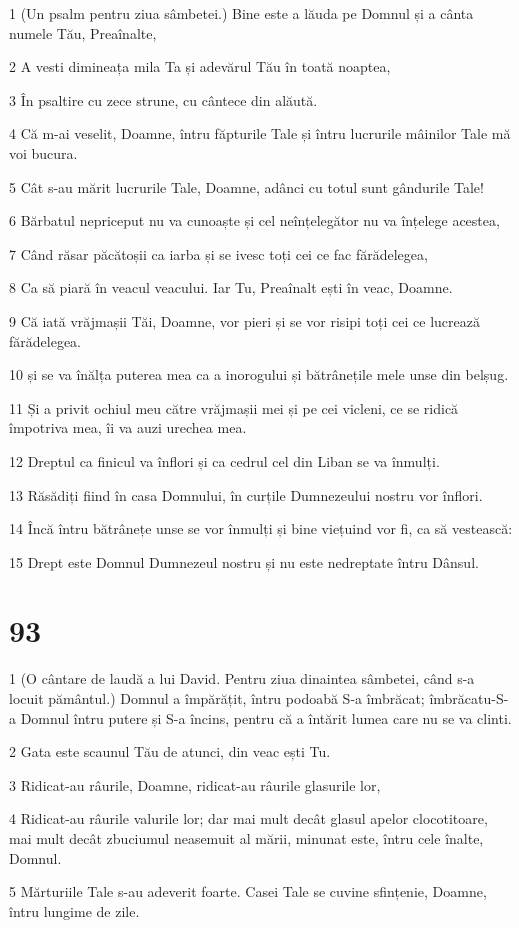 \par 1 (Un psalm pentru ziua sâmbetei.) Bine este a lăuda pe Domnul și a cânta numele Tău, Preaînalte,
\par 2 A vesti dimineața mila Ta și adevărul Tău în toată noaptea,
\par 3 În psaltire cu zece strune, cu cântece din alăută.
\par 4 Că m-ai veselit, Doamne, întru făpturile Tale și întru lucrurile mâinilor Tale mă voi bucura.
\par 5 Cât s-au mărit lucrurile Tale, Doamne, adânci cu totul sunt gândurile Tale!
\par 6 Bărbatul nepriceput nu va cunoaște și cel neînțelegător nu va înțelege acestea,
\par 7 Când răsar păcătoșii ca iarba și se ivesc toți cei ce fac fărădelegea,
\par 8 Ca să piară în veacul veacului. Iar Tu, Preaînalt ești în veac, Doamne.
\par 9 Că iată vrăjmașii Tăi, Doamne, vor pieri și se vor risipi toți cei ce lucrează fărădelegea.
\par 10 și se va înălța puterea mea ca a inorogului și bătrânețile mele unse din belșug.
\par 11 Și a privit ochiul meu către vrăjmașii mei și pe cei vicleni, ce se ridică împotriva mea, îi va auzi urechea mea.
\par 12 Dreptul ca finicul va înflori și ca cedrul cel din Liban se va înmulți.
\par 13 Răsădiți fiind în casa Domnului, în curțile Dumnezeului nostru vor înflori.
\par 14 Încă întru bătrânețe unse se vor înmulți și bine viețuind vor fi, ca să vestească:
\par 15 Drept este Domnul Dumnezeul nostru și nu este nedreptate întru Dânsul.

\chapter{93}

\par 1 (O cântare de laudă a lui David. Pentru ziua dinaintea sâmbetei, când s-a locuit pământul.) Domnul a împărățit, întru podoabă S-a îmbrăcat; îmbrăcatu-S-a Domnul întru putere și S-a încins, pentru că a întărit lumea care nu se va clinti.
\par 2 Gata este scaunul Tău de atunci, din veac ești Tu.
\par 3 Ridicat-au râurile, Doamne, ridicat-au râurile glasurile lor,
\par 4 Ridicat-au râurile valurile lor; dar mai mult decât glasul apelor clocotitoare, mai mult decât zbuciumul neasemuit al mării, minunat este, întru cele înalte, Domnul.
\par 5 Mărturiile Tale s-au adeverit foarte. Casei Tale se cuvine sfințenie, Doamne, întru lungime de zile.

